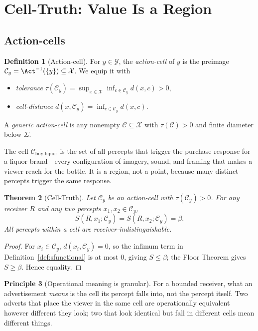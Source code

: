 \documentclass[twocolumn,11pt,a4paper]{article}
\theoremstyle{adv}
\newtheorem{theorem}{Theorem}[section]
\theoremstyle{definition}
\newtheorem{definition}[theorem]{Definition}
\newtheorem{principle}[theorem]{Principle}
\theoremstyle{remark}
\newcommand{\Out}{\mathcal{X}}         %
\newcommand{\Acts}{\mathcal{Y}}        %
\newcommand{\Cell}{\mathcal{C}}        %
\newcommand{\Recv}{R}                  %
\newcommand{\Sval}{S}                  %
\newcommand{\floor}{\beta}            %
\newcommand{\tol}{\tau}               %
\newcommand{\dist}{d}
\newcommand{\Sig}{\Sigma}
\begin{document}
\section{Cell-Truth: Value Is a Region}
\label{sec:cells}

\subsection{Action-cells}

\begin{definition}[Action-cell]
\label{def:cell}
For $y\in\Acts$, the \emph{action-cell} of $y$ is the preimage
$\Cell_y=\Act^{-1}(\{y\})\subseteq\Out$. We equip it with
\begin{itemize}[leftmargin=1.4em,itemsep=1pt]
\item \emph{tolerance} $\tol(\Cell_y)=\sup_{x\in\Out}\inf_{c\in\Cell_y}\dist(x,c)>0$,
\item \emph{cell-distance} $\dist(x,\Cell_y)=\inf_{c\in\Cell_y}\dist(x,c)$.
\end{itemize}
A \emph{generic action-cell} is any nonempty $\Cell\subseteq\Out$ with
$\tol(\Cell)>0$ and finite diameter below $\Sig$.
\end{definition}

The cell $\Cell_{\text{buy-liquor}}$ is the set of all percepts that
trigger the purchase response for a liquor brand---every configuration of
imagery, sound, and framing that makes a viewer reach for the bottle. It
is a region, not a point, because many distinct percepts trigger the same
response.

\begin{theorem}[Cell-Truth]
\label{thm:celltruth}
Let $\Cell_y$ be an action-cell with $\tol(\Cell_y)>0$. For any receiver
$\Recv$ and any two percepts $x_1,x_2\in\Cell_y$,
\[
  \Sval(\Recv,x_1;\Cell_y)=\Sval(\Recv,x_2;\Cell_y)=\floor.
\]
All percepts within a cell are receiver-indistinguishable.
\end{theorem}

\begin{proof}
For $x_i\in\Cell_y$, $\dist(x_i,\Cell_y)=0$, so the infimum term in
Definition~\ref{def:sfunctional} is at most $0$, giving
$\Sval\le\floor$; the Floor Theorem gives $\Sval\ge\floor$. Hence equality.
\end{proof}

\begin{principle}[Operational meaning is granular]
\label{prin:granular}
For a bounded receiver, what an advertisement \emph{means} is the cell its
percept falls into, not the percept itself. Two adverts that place the
viewer in the same cell are operationally equivalent however different
they look; two that look identical but fall in different cells mean
different things.
\end{principle}
\end{document}
